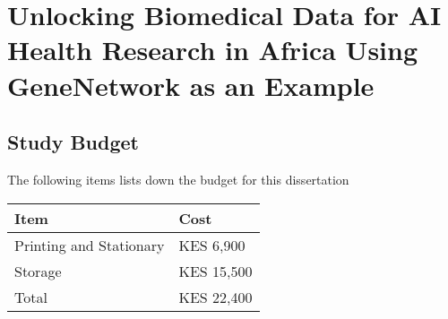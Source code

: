 \documentclass[11pt]{article}
\date{}
\title{}
\begin{document}
\section*{Unlocking Biomedical Data for AI Health Research in Africa Using GeneNetwork as an Example}
\label{sec:orgb21de0f}
\subsection*{Study Budget}
\label{sec:orgc0cd25e}
The following items lists down the budget for this dissertation

\begin{center}
\begin{tabular}{ll}
Item & Cost\\[0pt]
\hline
Printing and Stationary & KES 6,900\\[0pt]
Storage & KES 15,500\\[0pt]
\hline
Total & KES 22,400\\[0pt]
\end{tabular}
\end{center}
\end{document}
